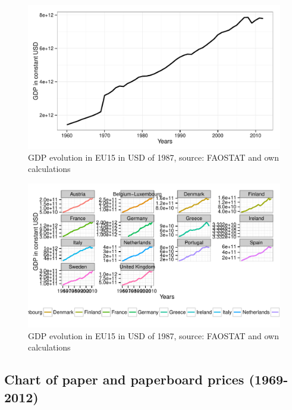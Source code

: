 \documentclass{scrartcl}\usepackage{graphicx, color}
\newenvironment{knitrout}{}{} %
\begin{document}
\begin{knitrout}
\color{fgcolor}\begin{figure}[h]


{\centering \includegraphics[width=.7\linewidth]{figure/GDPEU15Extended1} 

}

\caption[GDP  evolution in EU15 in USD of 1987, source]{GDP  evolution in EU15 in USD of 1987, source: FAOSTAT and own calculations\label{fig:GDPEU15Extended1}}
\end{figure}

\begin{figure}[h]


{\centering \includegraphics[width=.7\linewidth]{figure/GDPEU15Extended2} 

}

\caption[GDP  evolution in EU15 in USD of 1987, source]{GDP  evolution in EU15 in USD of 1987, source: FAOSTAT and own calculations\label{fig:GDPEU15Extended2}}
\end{figure}


\end{knitrout}



\subsection{Chart of paper and paperboard prices (1969-2012)}
\end{document}
